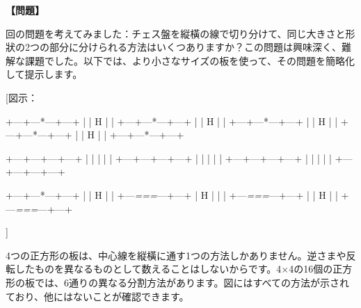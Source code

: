 \documentclass[10pt,a4paper,oneside,openany]{ltjsbook}
\begin{document}
\begin{tcolorbox}[colback=softblue,colframe=primaryblue,title=\textbf{第 288 問：CHEQUERED BOARD DIVISIONS.},arc=2mm,boxrule=1pt,breakable]
\textbf{【問題】}\par\vspace{0.3em}
回の問題を考えてみました：チェス盤を縦橫の線で切り分けて、同じ大きさと形狀の2つの部分に分けられる方法はいくつありますか？この問題は興味深く、難解な課題でした。以下では、より小さなサイズの板を使って、その問題を簡略化して提示します。

[図示：

    +---+---*---+---+
    |   |   H   |   |
    +---+---*---+---+
    |   |   H   |   |
    +---+---*---+---+
    |   |   H   |   |
    +---+---*---+---+
    |   |   H   |   |
    +---+---*---+---+

                    +---+---+---+---+
                    |   |   |   |   |
                    +---+---+---+---+
                    |   |   |   |   |
                    +---+---+---+---+
                    |   |   |   |   |
                    +---+---+---+---+

    +---+---*---+---+
    |   |   H   |   |
    +---\textit{===}---+---+
    |   H   |   |   |
    +---\textit{===}---+---+
    |   |   H   |   |
    +---\textit{===}---+---+

]

4つの正方形の板は、中心線を縦橫に通す1つの方法しかありません。逆さまや反転したものを異なるものとして数えることはしないからです。4×4の16個の正方形の板では、6通りの異なる分割方法があります。図にはすべての方法が示されており、他にはないことが確認できます。


\end{tcolorbox}
\end{document}

